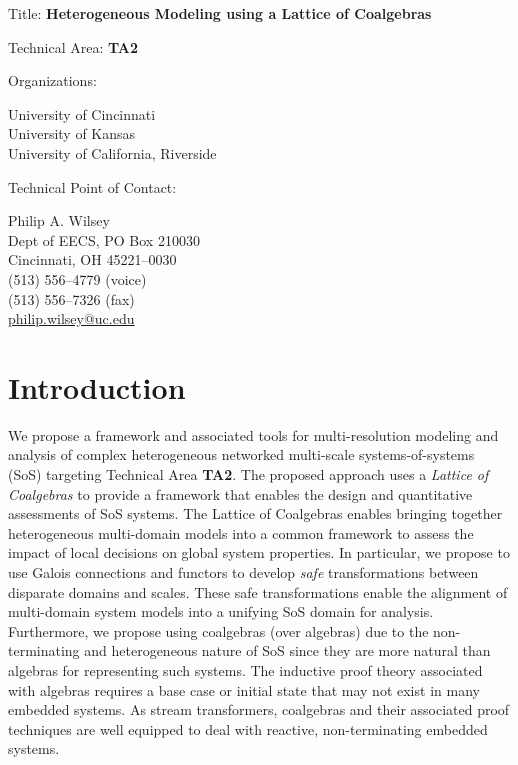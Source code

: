 \documentclass[12pt]{article}
\begin{document}
\noindent
{\Large Title: \textbf{Heterogeneous Modeling using a Lattice of Coalgebras}}

\bigskip
\bigskip
\bigskip
\bigskip
\bigskip

\noindent
Technical Area: \textbf{TA2}

\bigskip
\bigskip
\bigskip
\bigskip

\noindent
Organizations: \begin{minipage}[t]{4in}
  \textsf{University of Cincinnati} \\
  \textsf{University of Kansas} \\
  \textsf{University of California, Riverside}
\end{minipage}

\bigskip
\bigskip
\bigskip
\bigskip

\noindent
Technical Point of Contact: \begin{minipage}[t]{4in}
  Philip A. Wilsey \\
  Dept of EECS, PO Box 210030 \\
  Cincinnati, OH 45221--0030 \\
  (513) 556--4779 (voice) \\
  (513) 556--7326 (fax) \\
  \url{philip.wilsey@uc.edu}
\end{minipage}

\clearpage

\section{Introduction}

We propose a framework and associated tools for multi-resolution
modeling and analysis of complex heterogeneous networked multi-scale
systems-of-systems (SoS) targeting Technical Area \textbf{TA2}.  The
proposed approach uses a \emph{Lattice of Coalgebras} to provide a
framework that enables the design and quantitative assessments of SoS
systems.  The Lattice of Coalgebras enables bringing together
heterogeneous multi-domain models into a common framework to assess
the impact of local decisions on global system properties.  In
particular, we propose to use Galois connections and functors to
develop \emph{safe} transformations between disparate domains and
scales.  These safe transformations enable the alignment of
multi-domain system models into a unifying SoS domain for analysis.
Furthermore, we propose using coalgebras (over algebras) due to the
non-terminating and heterogeneous nature of SoS since they are more
natural than algebras for representing such systems.  The inductive
proof theory associated with algebras requires a base case or initial
state that may not exist in many embedded systems.  As stream
transformers, coalgebras and their associated proof techniques are
well equipped to deal with reactive, non-terminating embedded systems.
\end{document}
